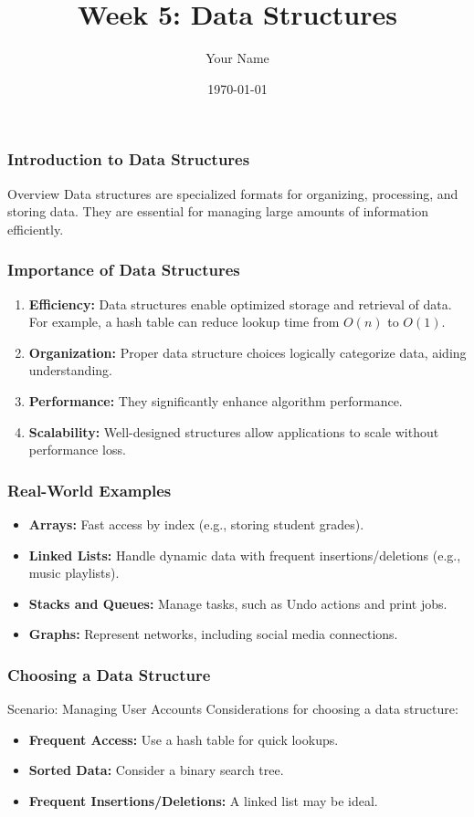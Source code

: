 \documentclass{beamer}
\title{Week 5: Data Structures}
\author{Your Name}
\institute{Your Institution}
\date{\today}
\begin{document}
\frame{\titlepage}

\begin{frame}[fragile]
    \frametitle{Introduction to Data Structures}
    \begin{block}{Overview}
        Data structures are specialized formats for organizing, processing, and storing data. 
        They are essential for managing large amounts of information efficiently.
    \end{block}
\end{frame}

\begin{frame}[fragile]
    \frametitle{Importance of Data Structures}
    \begin{enumerate}
        \item \textbf{Efficiency:} 
            Data structures enable optimized storage and retrieval of data.
            For example, a hash table can reduce lookup time from \(O(n)\) to \(O(1)\).
        \item \textbf{Organization:} 
            Proper data structure choices logically categorize data, aiding understanding.
        \item \textbf{Performance:} 
            They significantly enhance algorithm performance.
        \item \textbf{Scalability:} 
            Well-designed structures allow applications to scale without performance loss.
    \end{enumerate}
\end{frame}

\begin{frame}[fragile]
    \frametitle{Real-World Examples}
    \begin{itemize}
        \item \textbf{Arrays:} Fast access by index (e.g., storing student grades).
        \item \textbf{Linked Lists:} Handle dynamic data with frequent insertions/deletions (e.g., music playlists).
        \item \textbf{Stacks and Queues:} Manage tasks, such as Undo actions and print jobs.
        \item \textbf{Graphs:} Represent networks, including social media connections.
    \end{itemize}
\end{frame}

\begin{frame}[fragile]
    \frametitle{Choosing a Data Structure}
    \begin{block}{Scenario: Managing User Accounts}
        Considerations for choosing a data structure:
        \begin{itemize}
            \item \textbf{Frequent Access:} Use a hash table for quick lookups.
            \item \textbf{Sorted Data:} Consider a binary search tree.
            \item \textbf{Frequent Insertions/Deletions:} A linked list may be ideal.
        \end{itemize}
    \end{block}
\end{frame}
\end{document}
